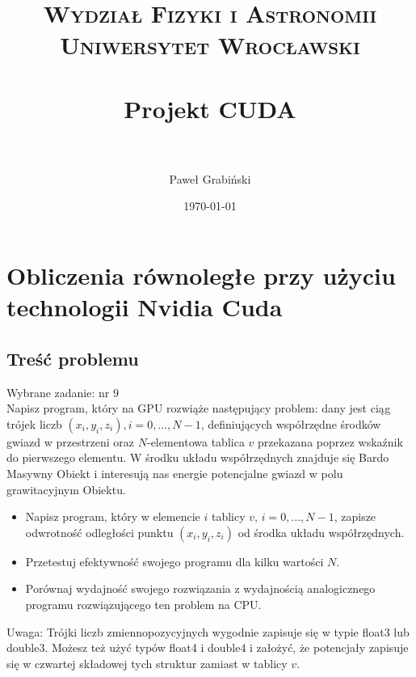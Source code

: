 \documentclass[paper=a4, fontsize=11pt]{scrartcl} %
\title{	
\normalfont \normalsize 
\textsc{Wydział Fizyki i Astronomii\\Uniwersytet Wrocławski} \\ [25pt] %
\horrule{0.5pt} \\[0.4cm] %
\huge Projekt CUDA \\ %
\horrule{2pt} \\[0.5cm] %
}
\author{Paweł Grabiński} %
\date{\normalsize\today} %
\numberwithin{equation}{section} %
\numberwithin{figure}{section} %
\numberwithin{table}{section} %
\begin{document}
\maketitle %


\section{Obliczenia równoległe przy użyciu technologii Nvidia Cuda}


\subsection{Treść problemu}
\center\large{Wybrane zadanie: nr $9$}\\
\normalsize Napisz program, który na GPU rozwiąże następujący problem: dany jest ciąg trójek liczb $ \left( x_i, y_i, z_i\right) , i = 0,...,N-1$, definiujących współrzędne środków gwiazd w przestrzeni oraz $N$-elementowa tablica $v$ przekazana poprzez wskaźnik do pierwszego elementu. W środku układu współrzędnych znajduje się Bardo Masywny Obiekt i interesują nas energie potencjalne gwiazd w polu grawitacyjnym Obiektu. 
\begin{itemize}
\item	Napisz program, który w elemencie $i$ tablicy $v$, $ i = 0,...,N-1$, zapisze odwrotność odległości punktu $ \left( x_i, y_i, z_i\right)$ od środka układu współrzędnych.  
\item Przetestuj efektywność swojego programu dla kilku wartości $N$.
\item Porównaj wydajność swojego rozwiązania z wydajnością analogicznego programu rozwiązującego ten problem na CPU.  
\end{itemize}
Uwaga: Trójki liczb zmiennopozycyjnych wygodnie zapisuje się w typie float3 lub double3. Możesz też użyć typów float4 i double4 i założyć, że potencjały zapisuje się w czwartej składowej tych struktur zamiast w tablicy $v$. 
\end{document}
